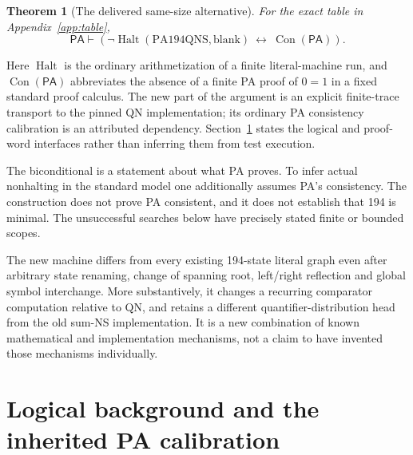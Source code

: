 \documentclass[11pt,letterpaper]{article}
\newcommand{\PA}{\mathsf{PA}}
\newcommand{\Con}{\operatorname{Con}}
\newcommand{\Halt}{\operatorname{Halt}}
\newtheorem{theorem}{Theorem}[section]
\begin{document}
\begin{theorem}[The delivered same-size alternative]
For the exact table in Appendix~\ref{app:table},
\[
 \boxed{\PA\vdash\left(
 \neg\Halt(\mathrm{PA194QNS},\mathrm{blank})\ 
 \longleftrightarrow\ \Con(\PA)\right).}
\]
\end{theorem}

Here $\Halt$ is the ordinary arithmetization of a finite literal-machine
run, and $\Con(\PA)$ abbreviates the absence of a finite PA proof of $0=1$
in a fixed standard proof calculus. The new part of the argument is an
explicit finite-trace transport to the pinned QN implementation; its
ordinary PA consistency calibration is an attributed dependency.
Section~\ref{sec:logical-background} states the logical and proof-word
interfaces rather than inferring them from test execution.

The biconditional is a statement about what PA proves. To infer actual
nonhalting in the standard model one additionally assumes PA's consistency.
The construction does not prove PA consistent, and it does not establish
that 194 is minimal. The unsuccessful searches below have precisely stated
finite or bounded scopes.

The new machine differs from every existing 194-state literal graph even
after arbitrary state renaming, change of spanning root, left/right
reflection and global symbol interchange. More substantively, it changes
a recurring comparator computation relative to QN, and retains a different
quantifier-distribution head from the old sum-NS implementation. It is a
new combination of known mathematical and implementation mechanisms,
not a claim to have invented those mechanisms individually.



\section{Logical background and the inherited PA calibration}
\label{sec:logical-background}
\end{document}
